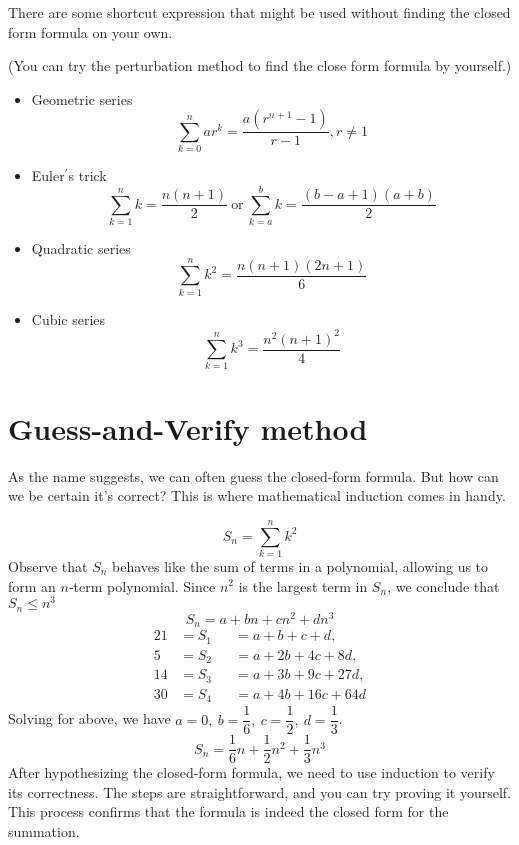 \newpage
There are some shortcut expression that might be used without finding the closed form formula on your own.
\begin{proposition}
	(You can try the perturbation method to find the close form formula by yourself.)
	
	\begin{itemize}
		\item Geometric series
		\[
		\sum_{k = 0}^n ar^k = \dfrac{a(r^{n+1} - 1)}{r - 1}, r \neq 1
		\]
		\item  Euler\(^{\prime}\)s trick
		\[
		\sum_{k = 1}^n k = \dfrac{n(n+1)}{2}\ \text{or}\ \sum_{k = a}^b k = \dfrac{(b - a + 1)(a + b)}{2}
		\]
		\item Quadratic series
		\[
			\sum_{k = 1}^n k^2 = \dfrac{n(n + 1)(2n + 1)}{6}
		\]
		\item Cubic series
		\[
			\sum_{k = 1}^n k^3 = \dfrac{n^2(n + 1)^2}{4}
		\]
	\end{itemize}
\end{proposition}

\section{Guess-and-Verify method}
As the name suggests, we can often guess the closed-form formula. But how can we be certain it's correct? This is where mathematical induction comes in handy.
\begin{eg}
	\[
		S_n = \sum_{k = 1}^n k^2
	\]
	Observe that \(S_n\) behaves like the sum of terms in a polynomial, allowing us to form an \(n\)-term polynomial. Since \(n^2\) is the largest term in \(S_n\), we conclude that \(S_n \leq  n^3\) 
	\[
		S_n = a + bn + cn^2 + dn^3
	\]
	\begin{alignat*}{2}
		1 &= S_1 &&= a + b + c + d,\\
		5 &= S_2 &&= a + 2b + 4c + 8d,\\
		14 &= S_3 &&= a + 3b + 9c + 27d,\\
		30 &= S_4 &&= a + 4b + 16c + 64d
	\end{alignat*}
	Solving for above, we have \(a = 0,\ b = \dfrac{1}{6},\ c = \dfrac{1}{2},\ d = \dfrac{1}{3}\).
	\[
		S_n = \dfrac{1}{6}n + \dfrac{1}{2}n^2 + \dfrac{1}{3}n^3
	\]
	After hypothesizing the closed-form formula, we need to use induction to verify its correctness. The steps are straightforward, and you can try proving it yourself. This process confirms that the formula is indeed the closed form for the summation.
\end{eg}

